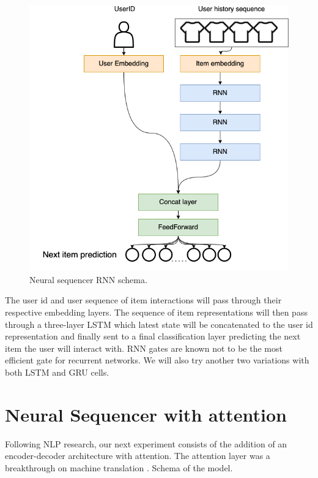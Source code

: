 \documentclass{tex_files/kththesis}
\begin{document}
\begin{figure}[H]
    \centering
    \includegraphics[scale=0.45]{images/models/RNN.png}
    \caption{Neural sequencer RNN schema.}
\end{figure}

The user id and user sequence of item interactions will pass through their respective embedding layers. The sequence of item representations will then pass through a three-layer LSTM which latest state will be concatenated to the user id representation and finally sent to a final classification layer predicting the next item the user will interact with. RNN gates are known not to be the most efficient gate for recurrent networks. We will also try another two variations with both LSTM and GRU cells.

\section{Neural Sequencer with attention}
Following NLP research, our next experiment consists of the addition of an encoder-decoder architecture with attention. The attention layer was a breakthrough on machine translation \cite{attention}. Schema of the model.
\end{document}
